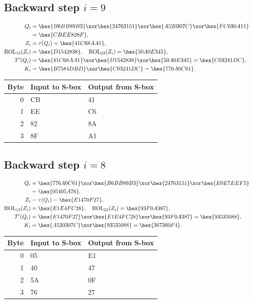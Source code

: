 \subsection*{Backward step $i=9$}
\begin{align*}
Q_i&=\hex{B6BB89B3}\xor\hex{24763151}\xor\hex{A520307C}\xor\hex{FC030A11}\\&=\hex{CBEE828F},\\
Z_i&=\tau(Q_i)=\hex{41C68AA1},\\
\operatorname{ROL}_{13}(Z_i)&=\hex{D1542838},\quad\operatorname{ROL}_{23}(Z_i)=\hex{50A0E345},\\
T'(Q_i)&=\hex{41C68AA1}\xor\hex{D1542838}\xor\hex{50A0E345}=\hex{C03241DC},\\
K_i&=\hex{B7584DBD}\xor\hex{C03241DC}=\hex{776A0C61}.\end{align*}
\begingroup\small
\begin{longtable}{rll}
\toprule
Byte & Input to S-box & Output from S-box\\\midrule
\endhead
0 & CB & 41\\
1 & EE & C6\\
2 & 82 & 8A\\
3 & 8F & A1\\
\bottomrule\end{longtable}
\endgroup
\subsection*{Backward step $i=8$}
\begin{align*}
Q_i&=\hex{776A0C61}\xor\hex{B6BB89B3}\xor\hex{24763151}\xor\hex{E0E7EEF5}\\&=\hex{05405A76},\\
Z_i&=\tau(Q_i)=\hex{E1470F27},\\
\operatorname{ROL}_{13}(Z_i)&=\hex{E1E4FC28},\quad\operatorname{ROL}_{23}(Z_i)=\hex{93F0A387},\\
T'(Q_i)&=\hex{E1470F27}\xor\hex{E1E4FC28}\xor\hex{93F0A387}=\hex{93535088},\\
K_i&=\hex{A520307C}\xor\hex{93535088}=\hex{367360F4}.\end{align*}
\begingroup\small
\begin{longtable}{rll}
\toprule
Byte & Input to S-box & Output from S-box\\\midrule
\endhead
0 & 05 & E1\\
1 & 40 & 47\\
2 & 5A & 0F\\
3 & 76 & 27\\
\bottomrule\end{longtable}
\endgroup
